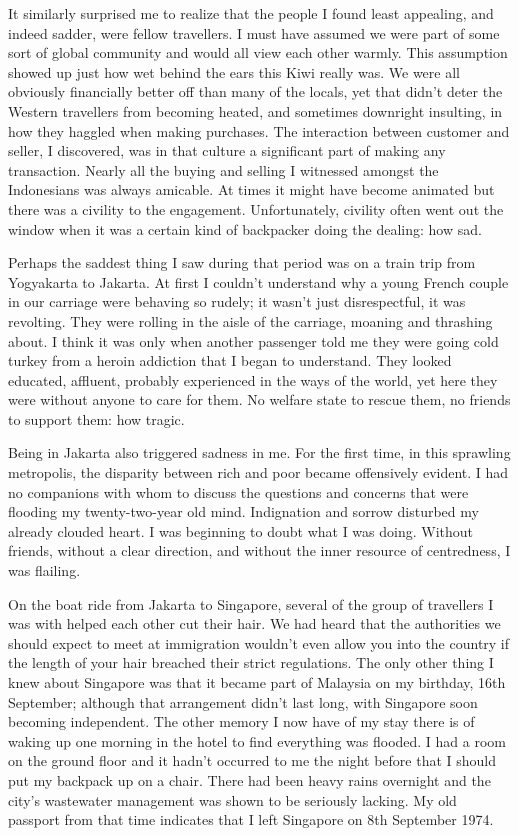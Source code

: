It similarly surprised me to realize that the people I found least
appealing, and indeed sadder, were fellow travellers. I must have
assumed we were part of some sort of global community and would all view
each other warmly. This assumption showed up just how wet behind the
ears this Kiwi really was. We were all obviously financially better off
than many of the locals, yet that didn't deter the Western travellers
from becoming heated, and sometimes downright insulting, in how they
haggled when making purchases. The interaction between customer and
seller, I discovered, was in that culture a significant part of making
any transaction. Nearly all the buying and selling I witnessed amongst
the Indonesians was always amicable. At times it might have become
animated but there was a civility to the engagement. Unfortunately,
civility often went out the window when it was a certain kind of
backpacker doing the dealing: how sad.

Perhaps the saddest thing I saw during that period was on a train trip
from Yogyakarta to Jakarta. At first I couldn't understand why a young
French couple in our carriage were behaving so rudely; it wasn't just
disrespectful, it was revolting. They were rolling in the aisle of the
carriage, moaning and thrashing about. I think it was only when another
passenger told me they were going cold turkey\cite{turkey}
from a heroin addiction that I began to understand.
They looked educated, affluent, probably experienced in the ways of the
world, yet here they were without anyone to care for them. No welfare
state to rescue them, no friends to support them: how tragic.

Being in Jakarta also triggered sadness in me. For the first time, in
this sprawling metropolis, the disparity between rich and poor became
offensively evident. I had no companions with whom to discuss the
questions and concerns that were flooding my twenty-two-year old mind.
Indignation and sorrow disturbed my already clouded heart. I was
beginning to doubt what I was doing. Without friends, without a clear
direction, and without the inner resource of centredness, I was
flailing.

On the boat ride from Jakarta to Singapore, several of the group of
travellers I was with helped each other cut their hair. We had heard
that the authorities we should expect to meet at immigration wouldn't
even allow you into the country if the length of your hair breached
their strict regulations. The only other thing I knew about Singapore
was that it became part of Malaysia\cite{malaysia}
on my birthday, 16th September; although that arrangement
didn't last long, with Singapore soon becoming independent. The other
memory I now have of my stay there is of waking up one morning in the
hotel to find everything was flooded. I had a room on the ground floor
and it hadn't occurred to me the night before that I should put my
backpack up on a chair. There had been heavy rains overnight and the
city's wastewater management was shown to be seriously lacking. My old
passport from that time indicates that I left Singapore on 8th September
1974.

